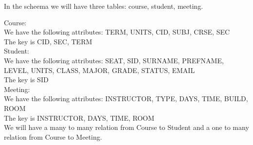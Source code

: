 



In the scheema we will have three tables: course, student, meeting.

Course: \\
We have the following attributes: TERM, UNITS, CID, SUBJ, CRSE, SEC \\
The key is CID, SEC, TERM \\

Student: \\
We have the following attributes: SEAT, SID, SURNAME, PREFNAME, LEVEL, UNITS,
CLASS, MAJOR, GRADE, STATUS, EMAIL \\
The key is SID \\

Meeting:\\
We have the following attributes: INSTRUCTOR, TYPE, DAYS, TIME, BUILD, ROOM\\
The key is INSTRUCTOR, DAYS, TIME, ROOM \\

We will have a many to many relation from Course to Student and a one to many relation from Course 
to Meeting. \\